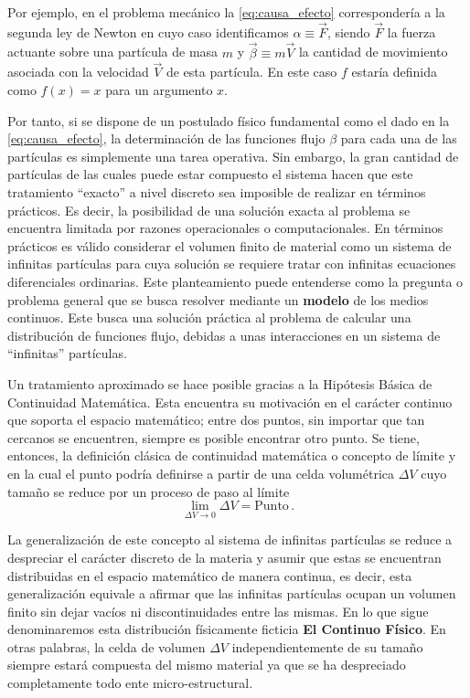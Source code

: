 \documentclass[../notas medios.tex]{subfiles}
\begin{document}
Por ejemplo, en el problema mecánico la \cref{eq:causa_efecto} correspondería a 
la segunda ley de Newton en cuyo caso identificamos $\alpha  \equiv \vec F$, 
siendo $\vec F$ la fuerza actuante sobre una partícula de masa $m$ y $\vec 
\beta  \equiv m\vec V$  la cantidad de movimiento asociada con la velocidad 
$\vec V$ de esta partícula.  En este caso $f$ estaría definida como  $f(x)=x$ 
para un argumento $x$.

Por tanto, si se dispone de un postulado físico fundamental como el dado en
la \cref{eq:causa_efecto}, la determinación de las funciones flujo $\beta$ para 
cada una de las partículas es simplemente una tarea operativa.  Sin embargo, la 
gran cantidad de partículas de las cuales puede estar compuesto el sistema 
hacen que este tratamiento ``exacto” a nivel discreto sea imposible de realizar 
en términos prácticos. Es decir, la posibilidad de una solución exacta al 
problema se encuentra limitada por razones operacionales o computacionales. En 
términos prácticos es válido considerar el volumen finito de material como un 
sistema de infinitas partículas para cuya solución se requiere tratar con 
infinitas ecuaciones diferenciales ordinarias.  Este planteamiento puede 
entenderse como la pregunta o problema general que se busca resolver mediante 
un {\bf modelo} de los medios continuos. Este busca una solución práctica al 
problema de calcular una distribución de funciones flujo, debidas a unas 
interacciones en un sistema de ``infinitas” partículas.

Un tratamiento aproximado se hace posible gracias a la Hipótesis Básica de 
Continuidad Matemática. Esta encuentra su motivación en el carácter continuo 
que soporta el espacio matemático; entre dos puntos, sin importar que tan 
cercanos se encuentren, siempre es posible encontrar otro punto. Se tiene, 
entonces, la definición clásica de continuidad matemática o concepto de límite 
y en la cual el punto podría definirse a partir de una celda volumétrica 
$\Delta V$ cuyo tamaño se reduce por un proceso de paso al límite
\begin{equation}
\lim_{\Delta V \to 0} \Delta V = \text{Punto}\, .
\label{eq:lim_point}
\end{equation}

La generalización de este concepto al sistema de infinitas partículas se reduce 
a despreciar el carácter discreto de la materia y asumir que estas se 
encuentran distribuidas en el espacio matemático de manera continua, es decir, 
esta generalización equivale a afirmar que las infinitas partículas ocupan un 
volumen finito sin dejar vacíos ni discontinuidades entre las mismas. En lo que 
sigue denominaremos esta distribución físicamente ficticia {\bf El Continuo 
Físico}. En otras palabras, la celda de volumen $\Delta V$  independientemente 
de su tamaño siempre estará compuesta del mismo material ya que se ha 
despreciado completamente todo ente micro-estructural.
\end{document}
